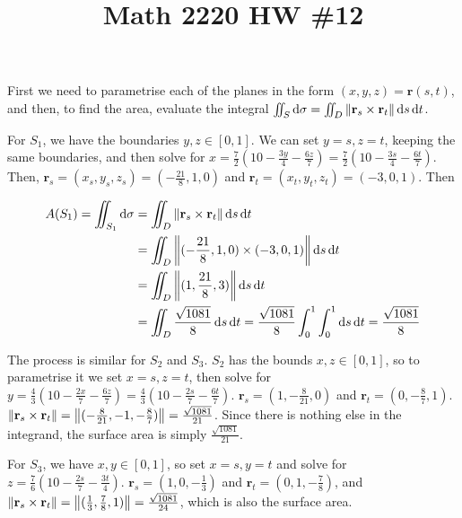 
\usepackage{esint}

\title{Math 2220 HW \#12}
\author{\name}
\maketitle


First we need to parametrise each of the planes in the form $(x, y, z) = \mathbf{r}(s, t)$, and then, to find the area, evaluate the integral $\iint_S \mathop{}\!\mathrm{d} \sigma = \iint_D \left\lVert\mathbf{r}_s \times \mathbf{r}_t\right\rVert \mathop{}\!\mathrm{d} s \mathop{}\!\mathrm{d} t$.

For $S_1$, we have the boundaries $y, z \in [0, 1]$. We can set $y = s, z = t$, keeping the same boundaries, and then solve for $x = \frac{7}{2}\left(10 - \frac{3y}{4} - \frac{6z}{7}\right) = \frac{7}{2}\left(10 - \frac{3s}{4} - \frac{6t}{7}\right)$. Then, $\mathbf{r}_s = (x_s, y_s, z_s) = (-\frac{21}{8}, 1, 0)$ and $\mathbf{r}_t = (x_t, y_t, z_t) = (-3, 0, 1)$. Then

\begin{align*}
  A(S_1) = \iint_{S_1} \diff \sigma &= \iint_D \norm{\mathbf{r}_s \times \mathbf{r}_t} \diff s \diff t \\
  &= \iint_D \norm{(-\frac{21}{8}, 1, 0) \times (-3, 0, 1)} \diff s \diff t \\
  &= \iint_D \norm{(1, \frac{21}{8}, 3)} \diff s \diff t \\
  &= \iint_D \frac{\sqrt{1081}}{8} \diff s \diff t = \frac{\sqrt{1081}}{8} \int_0^1 \int_0^1 \diff s \diff t = \frac{\sqrt{1081}}{8}
\end{align*}

The process is similar for $S_2$ and $S_3$. $S_2$ has the bounds $x, z \in [0, 1]$, so to parametrise it we set $x = s, z = t$, then solve for $y = \frac{4}{3}\left(10 - \frac{2x}{7} - \frac{6z}{7}\right) = \frac{4}{3}\left(10 - \frac{2s}{7} - \frac{6t}{7}\right)$. $\mathbf{r}_s = (1, -\frac{8}{21}, 0)$ and $\mathbf{r}_t = (0, -\frac{8}{7}, 1)$. $\left\lVert\mathbf{r}_s \times \mathbf{r}_t\right\rVert = \left\lVert(-\frac{8}{21}, -1, -\frac{8}{7})\right\rVert = \frac{\sqrt{1081}}{21}$. Since there is nothing else in the integrand, the surface area is simply $\frac{\sqrt{1081}}{21}$.

For $S_3$, we have $x, y \in [0, 1]$, so set $x = s, y = t$ and solve for $z = \frac{7}{6}\left(10 - \frac{2s}{7} - \frac{3t}{4}\right)$. $\mathbf{r}_s = (1, 0, -\frac{1}{3})$ and $\mathbf{r}_t = (0, 1, -\frac{7}{8})$, and $\left\lVert\mathbf{r}_s \times \mathbf{r}_t\right\rVert = \left\lVert(\frac{1}{3}, \frac{7}{8}, 1)\right\rVert = \frac{\sqrt{1081}}{24}$, which is also the surface area.

